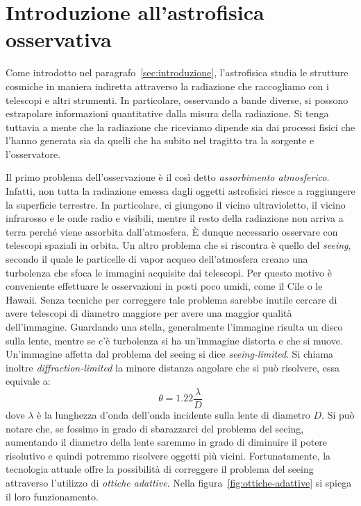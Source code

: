 \section{Introduzione all'astrofisica osservativa}\label{sec:astrofisica-osservativa}
Come introdotto nel paragrafo~\ref{sec:introduzione}, l'astrofisica studia le strutture cosmiche in maniera indiretta attraverso la radiazione che raccogliamo con i telescopi e altri strumenti. In particolare, osservando a bande diverse, si possono estrapolare informazioni quantitative dalla misura della radiazione. Si tenga tuttavia a mente che la radiazione che riceviamo dipende sia dai processi fisici che l'hanno generata sia da quelli che ha subito nel tragitto tra la sorgente e l'osservatore.

Il primo problema dell'osservazione è il così detto \emph{assorbimento atmosferico}. Infatti, non tutta la radiazione emessa dagli oggetti astrofisici riesce a raggiungere la superficie terrestre. In particolare, ci giungono il vicino ultravioletto, il vicino infrarosso e le onde radio e visibili, mentre il resto della radiazione non arriva a terra perché viene assorbita dall'atmosfera. È dunque necessario osservare con telescopi spaziali in orbita. Un altro problema che si riscontra è quello del \emph{seeing}, secondo il quale le particelle di vapor acqueo dell'atmosfera creano una turbolenza che sfoca le immagini acquisite dai telescopi. Per questo motivo è conveniente effettuare le osservazioni in posti poco umidi, come il Cile o le Hawaii. Senza tecniche per correggere tale problema sarebbe inutile cercare di avere telescopi di diametro maggiore per avere una maggior qualità dell'immagine. Guardando una stella, generalmente l'immagine risulta un disco sulla lente, mentre se c'è turbolenza si ha un'immagine distorta e che si muove. Un'immagine affetta dal problema del seeing si dice \emph{seeing-limited}. Si chiama inoltre \emph{diffraction-limited} la minore distanza angolare che si può risolvere, essa equivale a:
\[
    \theta = 1.22 \frac{\lambda}{D}
\]
dove $\lambda$ è la lunghezza d'onda dell'onda incidente sulla lente di diametro $D$. Si può notare che, se fossimo in grado di sbarazzarci del problema del seeing, aumentando il diametro della lente saremmo in grado di diminuire il potere risolutivo e quindi potremmo risolvere oggetti più vicini. Fortunatamente, la tecnologia attuale offre la possibilità di correggere il problema del seeing attraverso l'utilizzo di \emph{ottiche adattive}. Nella figura~\ref{fig:ottiche-adattive} si spiega il loro funzionamento. 

